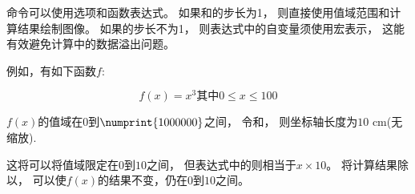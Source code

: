 \documentclass[../main.tex]{subfiles}
\begin{document}
命令可以使用选项和函数表达式。
如果和的步长为1，
则直接使用值域范围和计算结果绘制图像。
如果的步长不为1，
则表达式中的自变量须使用宏表示，
这能有效避免计算中的数据溢出问题。

例如，有如下函数$f$:

\[
f(x)=x^3 \text{其中} 0\leq x\leq 100
\]

$f(x)$的值域在$0$到$\numprint{1000000}$之间，
令和，
则坐标轴长度为$10$ cm(无缩放).

这将可以将值域限定在$0$到$10$之间，
但表达式中的则相当于$x \times 10$。
将计算结果除以，
可以使$f(x)$的结果不变，仍在$0$到$10$之间。

 \begin{tkzexample}[latex=10cm,small]
\end{tkzexample}
\end{document}
